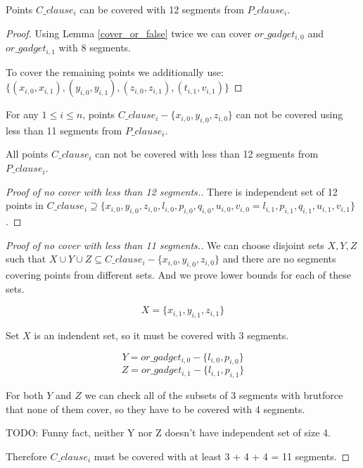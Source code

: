 \begin{lemma}
\label{cover_clauses_solution_false}
 Points $C\_clause_i$ can be covered with 12 segments from $P\_clause_i$.
\end{lemma}

\begin{proof}
Using Lemma \ref{cover_or_false} twice we can
cover $or\_gadget_{i,0}$ and  $or\_gadget_{i,1}$
with 8 segments.

To cover the remaining points we additionally use:
$\{ (x_{i, 0}, x_{i, 1}), (y_{i, 0}, y_{i, 1}),
(z_{i, 0}, z_{i, 1}), (t_{i, 1}, v_{i, 1}) \}$

\end{proof}

\begin{lemma}
\label{cover_clauses_segments_no_less}
For any $1 \le i \le n$,
points $C\_clause_i - \{ x_{i, 0}, y_{i, 0}, z_{i, 0}\}$
can not be covered using less than 11 segments from $P\_clause_i$.

All points $C\_clause_i$ can not be covered with less than 12 segments
from $P\_clause_i$.
\end{lemma}


\begin{proof}[Proof of no cover with less than 12 segments.]
There is independent set of 12 points in $C\_clause_i \supseteq
\{ x_{i, 0}, y_{i, 0}, z_{i, 0}, l_{i, 0}, p_{i, 0}, q_{i, 0},
u_{i, 0}, v_{i, 0} = l_{i, 1}, p_{i, 1}, q_{i, 1}, u_{i, 1}, v_{i, 1} \}$.
\end{proof}

\begin{proof}[Proof of no cover with less than 11 segments.]

We can choose disjoint sets $X, Y, Z$ such that
$X \cup Y \cup Z \subseteq C\_clause_i - \{x_{i, 0}, y_{i, 0}, z_{i, 0}\}$
and there are no segments covering points from different sets.
And we prove lower bounds for each of these sets.

$$X = \{x_{i, 1}, y_{i, 1}, z_{i, 1}\}$$

Set $X$ is an indendent set, so it must be covered with 3 segments.

$$Y = or\_gadget_{i, 0} - \{l_{i, 0}, p_{i, 0}\}$$
$$Z = or\_gadget_{i, 1} - \{l_{i, 1}, p_{i, 1}\}$$


For both $Y$ and $Z$ we can check all of the subsets of 3 segments
with brutforce that none of them cover, so they have to be covered with
4 segments.

TODO: Funny fact, neither Y nor Z doesn't have independent set of size 4.

Therefore $C\_clause_i$ must be covered with at least 3 + 4 + 4 = 11 segments.
\end{proof}

